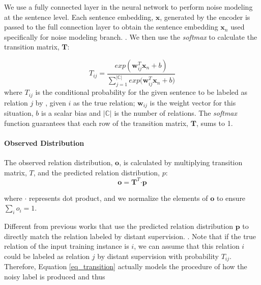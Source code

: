 We use a fully connected layer in the neural network to perform noise
modeling at the sentence level. Each sentence embedding, $\mathbf{x}$,
generated by the encoder is passed to the full connection layer to obtain the
sentence embedding $\mathbf{x}_n$ used specifically for noise modeling
branch.
.
 We then use the \emph{softmax} to calculate the transition matrix, $\mathbf{T}$:

\begin{equation}
T_{ij} = \frac{exp({\mathbf{w}_{ij}^T \mathbf{x}_n + b})}{\sum_{j=1}^{|\mathbb{C}|}{exp({\mathbf{w}_{ij}^T \mathbf{x}_n + b}})}
\end{equation}
where $T_{ij}$ is the conditional probability for the given sentence to be labeled as relation $j$ by \DS, given $i$ as the true relation; $\mathbf{w}_{ij}$ is the weight vector for this situation, $b$ is a scalar bias and $|\mathbb{C}|$ is the number of relations. The \emph{softmax} function guarantees that each row of the transition matrix, $\mathbf{T}$, sums to 1.

\paragraph{Observed Distribution}

The observed relation distribution, $\mathbf{o}$, is calculated by
multiplying transition matrix, $T$, and the predicted relation distribution,
$p$:
 \begin{equation}
\mathbf{o} = \mathbf{T}^T \bm\cdot \mathbf{p}
\label{eq_transition}
 \end{equation}

where $\bm\cdot$ represents dot product, and we normalize the elements of $\mathbf{o}$ to ensure $\sum_i{o_i}=1$.

Different from previous works that use the predicted relation distribution $\mathbf{p}$ to directly match the relation labeled by distant supervision. . Note that if the true relation of the input training instance is $i$, we can assume that this relation $i$ could be labeled as relation $j$ by distant supervision with probability $T_{ij}$. Therefore, Equation \ref{eq_transition} actually models the procedure of how the noisy label is produced and thus 

